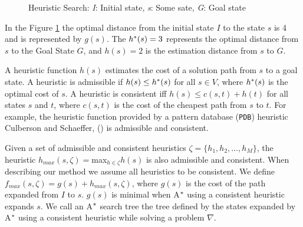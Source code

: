\begin{figure}[htb]
\centering
{}
\caption{Heuristic Search: \textit{I}: Initial state, \textit{s}: Some sate, \textit{G}: Goal state} \label{fig:searchSpace}
\end{figure}

In the Figure \ref{fig:searchSpace} the optimal distance from the initial state $I$ to  the state $s$ is 4 and is represented by $g(s)$. The $h\sp{*}(s) = 3$ represents the optimal distance from $s$ to the Goal State $G$, and $h(s) = 2$ is the estimation distance from $s$ to $G$.

A heuristic function $h(s)$ estimates the cost of a solution path from $s$ to a goal state. A heuristic is admissible if $h(s) \leq h\sp{*}(s)$ for all $s \in V$, where $h\sp{*}(s)$ is the optimal cost of $s$. A heuristic is consistent iff $h(s) \leq c(s,t) + h(t)$ for all states $s$ and $t$, where $c(s,t)$ is the cost of the cheapest path from $s$ to $t$. For example, the heuristic function provided by a pattern database (\texttt{PDB}) heuristic Culberson and Schaeffer, (\citeyear{culberson1998pattern}) is admissible and consistent.

Given a set of admissible and consistent heuristics $\zeta = \{h_{1}, h_{2}, \dots, h_{M}\}$, the heuristic $h_{max}(s,\zeta) = $max$_{h \in \zeta} h(s)$ is also admissible and consistent. When describing our method we assume all heuristics to be consistent. We define $f_{max}(s, \zeta) = g(s) + h_{max}(s, \zeta)$, where $g(s)$ is the cost of the path expanded from $I$ to $s$. $g(s)$ is minimal when A$\sp{*}$ using a consistent heuristic expands $s$. We call an A$\sp{*}$ search tree the tree defined by the states expanded by A$\sp{*}$ using a consistent heuristic while solving a problem $\nabla$.

